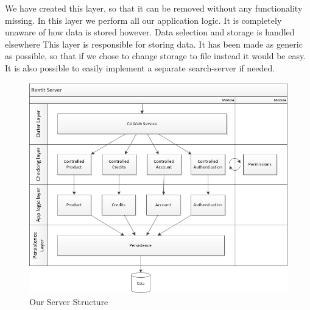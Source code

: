 We have created this layer, so that it can be removed without any functionality missing.
In this layer we perform all our application logic. It is completely unaware of how data is stored however. Data selection and storage is handled elsewhere
This layer is responsible for storing data. It has been made as generic as possible, so that if we chose to change storage to file instead it would be easy. It is also possible to easily implement a separate search-server if needed.

\begin{figure}[H]
  \includegraphics[width=\textwidth]{illustrations/ServerStructure.png}
  \caption{Our Server Structure}
  \label{fig:serverstructure}
\end{figure}
\newpage